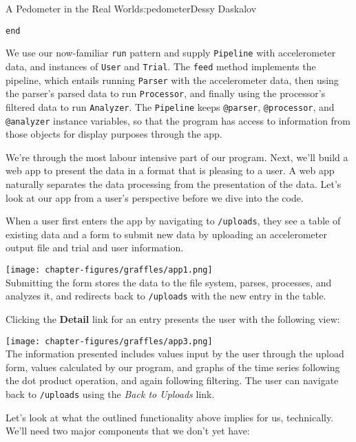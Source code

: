 \begin{aosachapter}{A Pedometer in the Real World}{s:pedometer}{Dessy Daskalov}
\begin{verbatim}
end
\end{verbatim}

We use our now-familiar \texttt{run} pattern and supply
\texttt{Pipeline} with accelerometer data, and instances of
\texttt{User} and \texttt{Trial}. The \texttt{feed} method implements
the pipeline, which entails running \texttt{Parser} with the
accelerometer data, then using the parser's parsed data to run
\texttt{Processor}, and finally using the processor's filtered data to
run \texttt{Analyzer}. The \texttt{Pipeline} keeps \texttt{@parser},
\texttt{@processor}, and \texttt{@analyzer} instance variables, so that
the program has access to information from those objects for display
purposes through the app.

\label{adding-a-friendly-interface}

We're through the most labour intensive part of our program. Next, we'll
build a web app to present the data in a format that is pleasing to a
user. A web app naturally separates the data processing from the
presentation of the data. Let's look at our app from a user's
perspective before we dive into the code.

\label{a-user-scenario}

When a user first enters the app by navigating to \texttt{/uploads},
they see a table of existing data and a form to submit new data by
uploading an accelerometer output file and trial and user information.

\texttt{[image: chapter-figures/graffles/app1.png]}\\ Submitting the
form stores the data to the file system, parses, processes, and analyzes
it, and redirects back to \texttt{/uploads} with the new entry in the
table.

Clicking the \textbf{Detail} link for an entry presents the user with
the following view:

\texttt{[image: chapter-figures/graffles/app3.png]}\\ The information
presented includes values input by the user through the upload form,
values calculated by our program, and graphs of the time series
following the dot product operation, and again following filtering. The
user can navigate back to \texttt{/uploads} using the \emph{Back to
Uploads} link.

Let's look at what the outlined functionality above implies for us,
technically. We'll need two major components that we don't yet have:


\end{aosachapter}
